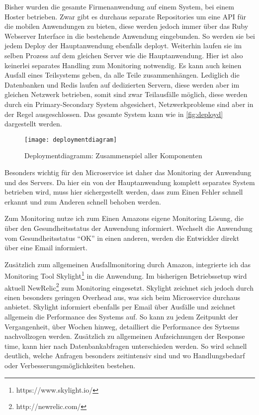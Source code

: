 Bisher wurden die gesamte Firmenanwendung auf einem System, bei einem Hoster betrieben. Zwar gibt es durchaus separate Repositories um eine API für die mobilen Anwendungen zu bieten, diese werden jedoch immer über das Ruby Webserver Interface in die bestehende Anwendung eingebunden. So werden sie bei jedem Deploy der Hauptanwendung ebenfalls deployt. Weiterhin laufen sie im selben Prozess auf dem gleichen Server wie die Hauptanwendung. Hier ist also keinerlei separates Handling zum Monitoring notwendig. Es kann auch keinen Ausfall eines Teilsystems geben, da alle Teile zusammenhängen. Lediglich die Datenbanken und Redis laufen auf dedizierten Servern, diese werden aber im gleichen Netzwerk betrieben, somit sind zwar Teilausfälle möglich, diese werden durch ein Primary-Secondary System abgesichert, Netzwerkprobleme sind aber in der Regel ausgeschlossen. Das gesamte System kann wie in \autoref{fig:deployd} dargestellt werden.

\begin{figure}[!ht]
    \centering
    \caption{Deploymentdiagramm: Zusammenspiel aller Komponenten}
    \label{fig:deployd}
    \texttt{[image: deploymentdiagram]}
\end{figure}

Besonders wichtig für den Microservice ist daher das Monitoring der Anwendung und des Servers. Da hier ein von der Hauptanwendung komplett separates System betrieben wird, muss hier sichergestellt werden, dass zum Einen Fehler schnell erkannt und zum Anderen schnell behoben werden. 

Zum Monitoring nutze ich zum Einen Amazons eigene Monitoring Lösung, die über den Gesundheitsstatus der Anwendung informiert. Wechselt die Anwendung vom Gesundheitsstatus ``OK'' in einen anderen, werden die Entwickler direkt über eine Email informiert.

Zusätzlich zum allgemeinen Ausfallmonitoring durch Amazon, integrierte ich das Monitoring Tool Skylight\footnote{https://www.skylight.io/} in die Anwendung. Im bisherigen Betriebssetup wird aktuell NewRelic\footnote{http://newrelic.com/} zum Monitoring eingesetzt. Skylight zeichnet sich jedoch durch einen besonders geringen Overhead aus, was sich beim Microservice durchaus anbietet. Skylight informiert ebenfalls per Email über Ausfälle und zeichnet allgemein die Performance des Systems auf. So kann zu jedem Zeitpunkt der Vergangenheit, über Wochen hinweg, detailliert die Performance des Sytsems nachvollzogen werden. Zusätzlich zu allgemeinen Aufzeichnungen der Response time, kann hier nach Datenbankabfragen unterschieden werden. So wird schnell deutlich, welche Anfragen besonders zeitintensiv sind und wo Handlungsbedarf oder Verbesserungsmöglichkeiten bestehen. 

